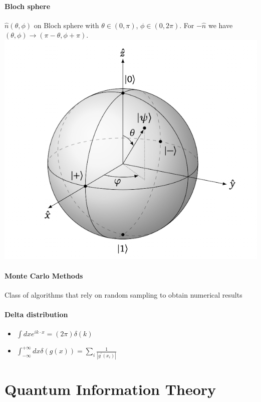 \paragraph{Bloch sphere}$\hat{n}(\theta, \phi)$ on Bloch sphere with $\theta \in (0, \pi)$, $\phi \in (0,2 \pi)$. 
For $- \hat{n}$ we have $(\theta, \phi) \to (\pi - \theta , \phi + \pi) $.\\
\includegraphics[scale=0.2]{fig/BlochSph.png}

\paragraph{Monte Carlo Methods} Class of algorithms that rely on random sampling to obtain numerical results

\paragraph{Delta distribution}
\begin{itemize}
  \item $\int d x e^{i k \cdot x}=(2 \pi) \delta(k)$
  \item $\int_{-\infty}^{+\infty} d x \delta(g(x))=\sum_i \frac{1}{\left|g^{\prime}\left(x_i\right)\right|} $
\end{itemize}

\section{Quantum Information Theory}
